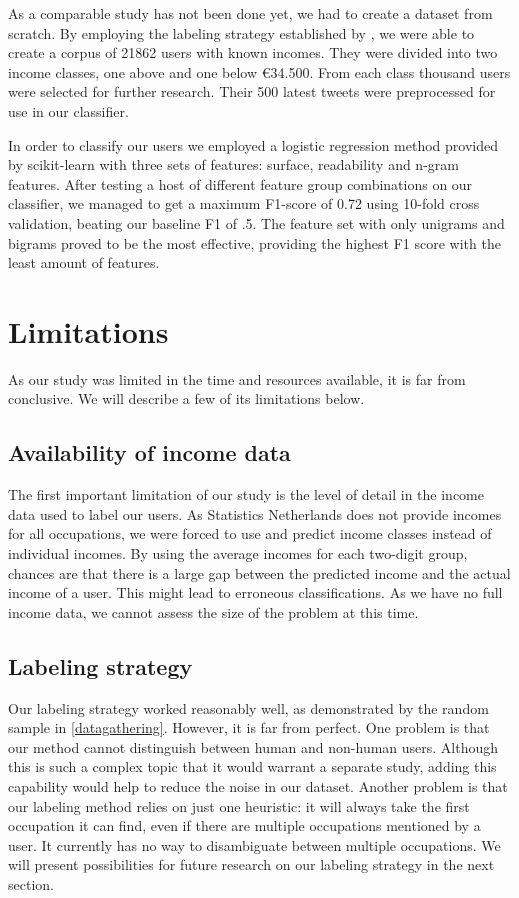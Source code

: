 \documentclass[
10pt, %
a4paper, %
oneside, %
headinclude,footinclude, %
] {book}%
\begin{document}
As a comparable study has not been done yet, we had to create a dataset from scratch. By employing the labeling strategy established by \citet{sloan}, we were able to create a corpus of 21862 users with known incomes. They were divided into two income classes, one above and one below \euro 34.500. From each class thousand users were selected for further research. Their 500 latest tweets were preprocessed for use in our classifier.

In order to classify our users we employed a logistic regression method provided by scikit-learn \citep{sklearn} with three sets of features: surface, readability and n-gram features. After testing a host of different feature group combinations on our classifier, we managed to get a maximum F1-score of 0.72 using 10-fold cross validation, beating our baseline F1 of .5. The feature set with only unigrams and bigrams proved to be the most effective, providing the highest F1 score with the least amount of features.

\section{Limitations}
As our study was limited in the time and resources available, it is far from conclusive. We will describe a few of its limitations below.

\subsection{Availability of income data}
The first important limitation of our study is the level of detail in the income data used to label our users. As Statistics Netherlands does not provide incomes for all occupations, we were forced to use and predict income classes instead of individual incomes. By using the average incomes for each two-digit group, chances are that there is a large gap between the predicted income and the actual income of a user. This might lead to erroneous classifications. As we have no full income data, we cannot assess the size of the problem at this time.

\subsection{Labeling strategy}
Our labeling strategy worked reasonably well, as demonstrated by the random sample in \autoref{datagathering}. However, it is far from perfect. One problem is that our method cannot distinguish between human and non-human users. Although this is such a complex topic that it would warrant a separate study, adding this capability would help to reduce the noise in our dataset. Another problem is that our labeling method relies on just one heuristic: it will always take the first occupation it can find, even if there are multiple occupations mentioned by a user. It currently has no way to disambiguate between multiple occupations. We will present possibilities for future research on our labeling strategy in the next section.
\end{document}
